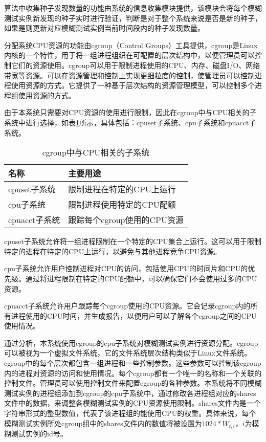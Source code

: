 \documentclass[master]{thesis-uestc}
\begin{document}
算法中收集种子发现数量的功能由系统的信息收集模块提供，该模块会将每个模糊测试实例新发现的种子实时进行验证，判断是对于整个系统来说是否是新的种子，如果是则更新对应模糊测试实例当前时间段内的种子发现数量。

分配系统CPU资源的功能由cgroup（Control Groups）工具提供，cgroup是Linux内核的一个特性，用于将一组进程组织在可配置的层次结构中，以便管理员可以控制它们的资源使用。cgroup可以用于限制进程使用的CPU、内存、磁盘I/O、网络带宽等资源。可以在资源管理和控制上实现更细粒度的控制，使管理员可以控制进程使用资源的方式。它提供了一种基于层次结构的资源管理模型，可以控制多个进程组使用资源的方式。


由于本系统只需要对CPU资源的使用进行限制，因此在cgroup中与CPU相关的子系统中进行选择，如表\ref{table_cgroup}所示，具体包括：cpuset子系统、cpu子系统和cpuacct子系统。

\begin{table}[!htbp]
    \caption{cgroup中与CPU相关的子系统}
    \begin{tabular}{ll}
    \toprule
    名称 & 主要用途 \\
    \midrule
    cpuset子系统 & 限制进程在特定的CPU上运行 \\
    cpu子系统 & 限制进程使用特定的CPU配额 \\
    cpuacct子系统 & 跟踪每个cgroup使用的CPU资源 \\
    \bottomrule
    \end{tabular}
    \label{table_cgroup}
    \vspace{6pt}
\end{table}

cpuset子系统允许将一组进程限制在一个特定的CPU集合上运行。这可以用于限制特定的进程在特定的CPU上运行，以避免与其他进程竞争CPU资源。

cpu子系统允许用户控制进程对CPU的访问，包括使用CPU的时间片和CPU的优先级。通过将进程限制在特定的CPU配额中，可以确保它们不会使用过多的CPU资源。

cpuacct子系统允许用户跟踪每个cgroup使用的CPU资源。它会记录cgroup内的所有进程使用的CPU时间，并生成报告，以便用户可以了解各个cgroup之间的CPU使用情况。

通过分析，本系统使用cgroup的cpu子系统对模糊测试实例进行资源分配。cgroup可以被视为一个虚拟文件系统，它的文件系统层次结构类似于Linux文件系统。cgroup中的每个层次都包含一组进程和一些控制参数。这些参数可以控制该cgroup内的进程对资源的访问和使用情况。每个cgroup都有一个唯一的名称和一个关联的控制文件。管理员可以使用控制文件来配置cgroup的各种参数。本系统将不同模糊测试实例的进程组添加到cgroup的cpu子系统中，通过修改各进程组对应的shares文件中的数据，来调整各模糊测试实例的CPU资源使用限制。shares文件内是一个字符串形式的整型数值，代表了该进程组的能使用CPU的权重。具体来说，每个模糊测试实例所处cgroup组中的shares文件内的数值将被设置为$1024 * W_{t,i}$，$i$为模糊测试实例的id号。
\end{document}
